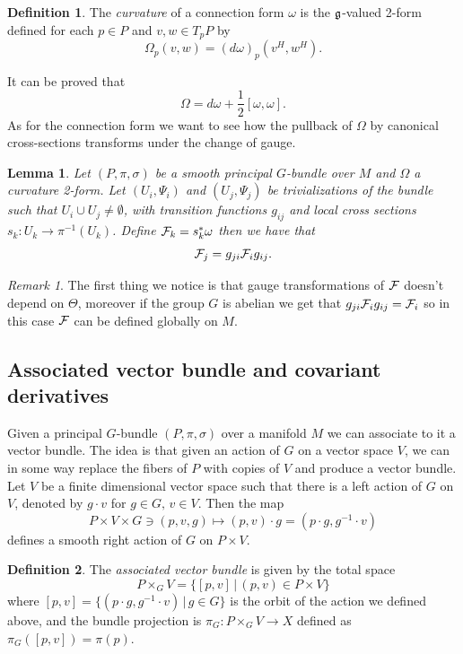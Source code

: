 \documentclass{article}
\newtheorem{lemma}{Lemma}
\theoremstyle{definition}
\newtheorem{defi}{Definition}
\theoremstyle{remark}
\newtheorem{rmk}{Remark}
\begin{document}
\begin{defi}
    The \emph{curvature} of a connection form \(\omega\) is the \(\mathfrak{g}\)-valued 2-form defined for each \(p\in P\) and \(v,w\in T_pP\) by
    \[\Omega_p(v,w)=(d\omega)_p(v^H,w^H).\]
\end{defi}

It can be proved that 
\[\Omega = d\omega + \frac{1}{2}\left[\omega,\omega\right].\]
As for the connection form we want to see how the pullback of \(\Omega\) by canonical cross-sections transforms under the change of gauge.

\begin{lemma}
    Let \((P, \pi, \sigma)\) be a smooth principal \(G\)-bundle over \(M\) and \(\Omega\) a curvature 2-form. Let \((U_i,\Psi_i)\) and \((U_j,\Psi_j)\) be trivializations of the bundle such that \(U_i\cup U_j\not = \emptyset\), with transition functions \(g_{ij}\) and local cross sections \(s_k\colon U_k\to \pi^{-1}(U_k)\). Define \(\mathcal{F}_k=s_k^*\omega\) then we have that 
    \begin{equation}\label{local field strenght transformation}
        \mathcal{F}_j=g_{ji}\mathcal{F}_ig_{ij}.
    \end{equation}
\end{lemma}

\begin{rmk}
    The first thing we notice is that gauge transformations of \(\mathcal{F}\) doesn't depend on \(\Theta\), moreover if the group \(G\) is abelian we get that \(g_{ji}\mathcal{F}_ig_{ij}=\mathcal{F}_i\) so in this case \(\mathcal{F}\) can be defined globally on \(M\).
\end{rmk}

\subsection{Associated vector bundle and covariant derivatives}

Given a principal \(G\)-bundle \((P,\pi,\sigma)\) over a manifold \(M\) we can associate to it a vector bundle. The idea is that given an action of \(G\) on a vector space \(V\), we can in some way replace the fibers of \(P\) with copies of \(V\) and produce a vector bundle.
Let \(V\) be a finite dimensional vector space such that there is a left action of \(G\) on \(V\), denoted by \(g\cdot v\) for \(g\in G, \, v\in V\). Then the map
\[P\times V\times G \ni (p,v,g)\mapsto (p,v)\cdot g = (p\cdot g,g^{-1}\cdot v)\]
defines a smooth right action of \(G\) on \(P\times V\). 

\begin{defi}
    The \emph{associated vector bundle} is given by the total space
    \[P\times_G V=\{[p,v]\,|\, (p,v)\in P\times V\}\]
    where \([p,v]=\{(p\cdot g,g^{-1}\cdot v)\,|\,g\in G\}\) is the orbit of the action we defined above, and the bundle projection is \(\pi_G\colon P\times_G V\to X\) defined as \(\pi_G([p,v])=\pi(p)\).
\end{defi}
\end{document}
